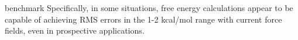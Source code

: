 


benchmark
Specifically, in some
situations, free energy calculations appear to be capable
of achieving RMS errors in the 1-2 kcal/mol range with
current force fields, even in prospective applications.

